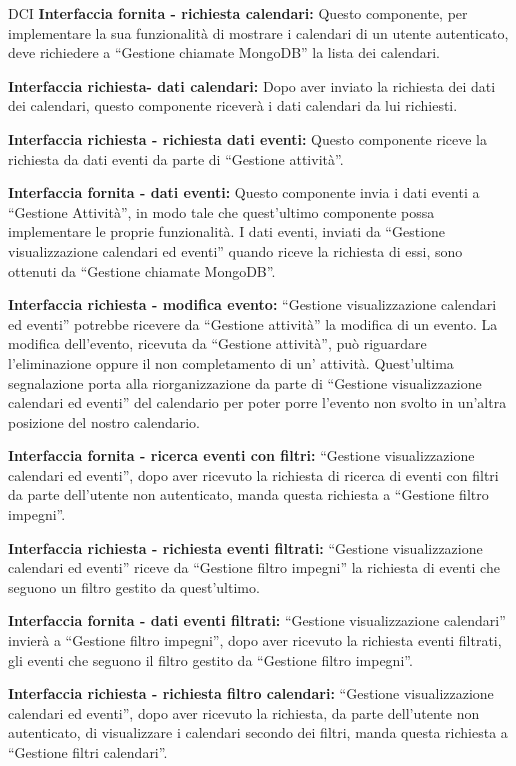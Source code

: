 \begin{listaPersonale}{DCI}
    \textbf{Interfaccia fornita - richiesta calendari:} Questo componente, per implementare la sua funzionalità di mostrare i calendari di un utente autenticato, deve richiedere a “Gestione chiamate MongoDB” la lista dei calendari.

    \textbf{Interfaccia richiesta- dati calendari:} Dopo aver inviato la richiesta dei dati dei calendari, questo componente riceverà i dati calendari da lui richiesti.

    \textbf{Interfaccia richiesta - richiesta dati eventi:} Questo componente riceve la richiesta da dati eventi da parte di “Gestione attività”.

    \textbf{Interfaccia fornita - dati eventi:} Questo componente invia i dati eventi a “Gestione Attività”, in modo tale che quest'ultimo componente possa implementare le proprie funzionalità. I dati eventi, inviati da “Gestione visualizzazione calendari ed eventi” quando riceve la richiesta di essi, sono ottenuti da “Gestione chiamate MongoDB”.

    \textbf{Interfaccia richiesta - modifica evento:} “Gestione visualizzazione calendari ed eventi” potrebbe ricevere da “Gestione attività” la modifica di un evento. La modifica dell'evento, ricevuta da “Gestione attività”, può riguardare l'eliminazione oppure il non completamento di un' attività. Quest'ultima segnalazione porta alla riorganizzazione da parte di “Gestione visualizzazione calendari ed eventi” del calendario per poter porre l'evento non svolto in un'altra posizione del nostro calendario.

    \textbf{Interfaccia fornita - ricerca eventi con filtri:} “Gestione visualizzazione calendari ed eventi”, dopo aver ricevuto la richiesta di ricerca di eventi con filtri da parte dell'utente non autenticato, manda questa richiesta a “Gestione filtro impegni”.

    \textbf{Interfaccia richiesta - richiesta eventi filtrati:} “Gestione visualizzazione calendari ed eventi” riceve da “Gestione filtro impegni” la richiesta di eventi che seguono un filtro gestito da quest'ultimo.

    \textbf{Interfaccia fornita - dati eventi filtrati:} “Gestione visualizzazione calendari” invierà  a “Gestione filtro impegni”, dopo aver ricevuto la richiesta eventi filtrati, gli eventi che seguono il filtro gestito da “Gestione filtro impegni”.

    \textbf{Interfaccia richiesta - richiesta filtro calendari:} “Gestione visualizzazione calendari ed eventi”, dopo aver ricevuto la richiesta, da parte dell'utente non autenticato, di visualizzare i calendari secondo dei filtri, manda questa richiesta a “Gestione filtri calendari”.


\end{listaPersonale}
